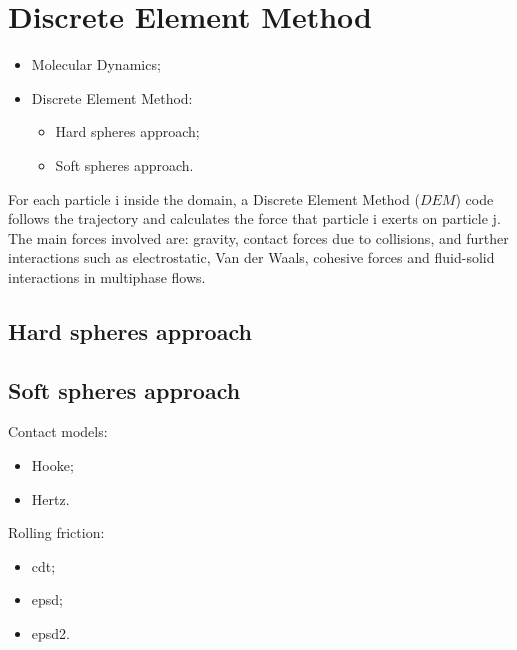 
\chapter{Discrete Element Method}
\label{cap:dem}


\begin{itemize}
  \item{Molecular Dynamics;}
  \item{Discrete Element Method:
  \begin{itemize}
  \item{Hard spheres approach;}
  \item{Soft spheres approach.}
\end{itemize} }
\end{itemize}

For each particle i inside the domain, a Discrete Element Method ($DEM$) code
follows the trajectory and calculates the force that particle i exerts on particle j.
The main forces involved are: gravity, contact forces due to collisions, and
further interactions such as electrostatic, Van der Waals, cohesive forces and fluid-solid interactions in 
multiphase flows. 

\section{Hard spheres approach}
\label{sec:hardspheresapproach}

\section{Soft spheres approach}
\label{sec:softspheresapproach}

Contact models:
\begin{itemize}
  \item{Hooke;}
  \item{Hertz.}
\end{itemize}
Rolling friction:
\begin{itemize}
  \item{cdt;}
  \item{epsd;}
  \item{epsd2.}
\end{itemize}

